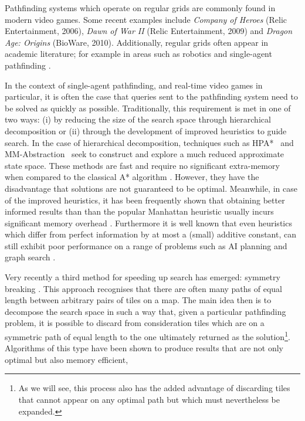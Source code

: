 Pathfinding systems which operate on regular grids are commonly found in modern video games.
Some recent examples include \emph{Company of Heroes} (Relic Entertainment, 2006), \emph{Dawn of War II} (Relic
Entertainment, 2009) and \emph{Dragon Age: Origins} (BioWare, 2010).
Additionally, regular grids often appear in academic literature; for example in areas such as robotics \cite{choset05} and
single-agent pathfinding \cite{botea04,bjornsson06,sturtevant07}.
\par
In the context of single-agent pathfinding, and real-time video games in particular, it is often the case that queries sent to
the pathfinding system  need to be solved as quickly as possible.
Traditionally, this requirement is met in one of two ways: (i) by reducing the size of the search space through hierarchical 
decomposition or (ii) through the development of improved heuristics to guide search.
In the case of hierarchical decomposition, techniques such as
HPA*~\cite{botea04} and MM-Abstraction~\cite{sturtevant07} seek to construct and explore
a much reduced approximate state space.
These methods are fast and require no significant extra-memory when compared to the classical
A* algorithm \cite{hart68}.
However, they have the disadvantage that solutions are not guaranteed to be optimal.
Meanwhile, in case of the improved heuristics, it has been frequently shown
that obtaining better informed results than than the popular
Manhattan heuristic usually incurs significant memory overhead 
\cite{sturtevant09,goldberg05,Cazenave:06,bjornsson06}.
Furthermore it is well known that even heuristics which differ from perfect information 
by at most a (small) additive constant, can still exhibit poor performance on a range of 
problems such as AI planning and graph search \cite{helmert08,pohl77}.
\par
Very recently a third method for speeding up search has emerged: symmetry breaking \cite{pochter10,harabor10}.
This approach recognises that there are often many paths of equal length between arbitrary pairs of tiles on a map.
The main idea then is to decompose the search space in such a way that, given a particular pathfinding problem, it is possible to
discard from consideration tiles which are on a symmetric path of equal length to the one ultimately returned 
as the solution\footnote{
As we will see, this process also has the added advantage of discarding tiles 
that cannot appear on any optimal path but which must nevertheless be expanded.}.
Algorithms of this type have been  shown to produce results that are not only optimal but also memory efficient, 
